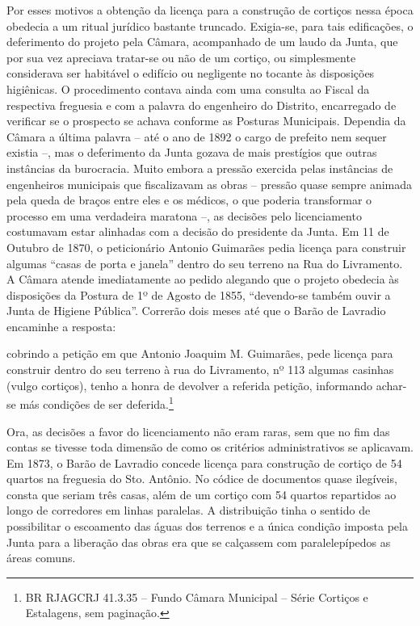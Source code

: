 Por esses motivos a obtenção da licença para a construção de cortiços
nessa época obedecia a um ritual jurídico bastante truncado. Exigia-se,
para tais edificações, o deferimento do projeto pela Câmara, acompanhado
de um laudo da Junta, que por sua vez apreciava tratar-se ou não de um
cortiço, ou simplesmente considerava ser habitável o edifício ou
negligente no tocante às disposições higiênicas. O procedimento contava
ainda com uma consulta ao Fiscal da respectiva freguesia e com a palavra
do engenheiro do Distrito, encarregado de verificar se o prospecto se
achava conforme as Posturas Municipais. Dependia da Câmara a última
palavra -- até o ano de 1892 o cargo de prefeito nem sequer existia --,
mas o deferimento da Junta gozava de mais prestígios que outras
instâncias da burocracia. Muito embora a pressão exercida pelas
instâncias de engenheiros municipais que fiscalizavam as obras --
pressão quase sempre animada pela queda de braços entre eles e os
médicos, o que poderia transformar o processo em uma verdadeira maratona
--, as decisões pelo licenciamento costumavam estar alinhadas com a
decisão do presidente da Junta. Em 11 de Outubro de 1870, o peticionário
Antonio Guimarães pedia licença para construir algumas ``casas de porta
e janela'' dentro do seu terreno na Rua do Livramento. A Câmara atende
imediatamente ao pedido alegando que o projeto obedecia às disposições
da Postura de 1º de Agosto de 1855, ``devendo-se também ouvir a Junta de
Higiene Pública''. Correrão dois meses até que o Barão de Lavradio
encaminhe a resposta:

cobrindo a petição em que Antonio Joaquim M. Guimarães, pede licença
para construir dentro do seu terreno à rua do Livramento, nº 113 algumas
casinhas (vulgo cortiços), tenho a honra de devolver a referida petição,
informando achar-se más condições de ser deferida.\footnote{BR RJAGCRJ
  41.3.35 -- Fundo Câmara Municipal -- Série Cortiços e Estalagens, sem
  paginação.}

Ora, as decisões a favor do licenciamento não eram raras, sem que no fim
das contas se tivesse toda dimensão de como os critérios administrativos
se aplicavam. Em 1873, o Barão de Lavradio concede licença para
construção de cortiço de 54 quartos na freguesia do Sto. Antônio. No
códice de documentos quase ilegíveis, consta que seriam três casas, além
de um cortiço com 54 quartos repartidos ao longo de corredores em linhas
paralelas. A distribuição tinha o sentido de possibilitar o escoamento
das águas dos terrenos e a única condição imposta pela Junta para a
liberação das obras era que se calçassem com paralelepípedos as áreas
comuns.

